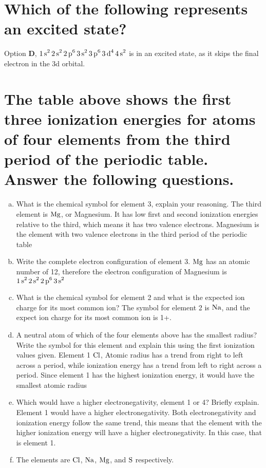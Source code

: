 \documentclass[11pt]{article}
\begin{document}
\section{Which of the following represents an excited state?}
\label{sec:orgaf3fbb6}
Option \textbf{D}, \(\ce{1s^2 2s^2 2p^6 3s^2 3p^6 3d^4 4s^2}\) is in an excited state, as it skips the final electron in the 3d orbital.

\section{The table above shows the first three ionization energies for atoms of four elements from the third period of the periodic table. Answer the following questions.}
\label{sec:org3775e52}
\begin{enumerate}[(a)]
\item What is the chemical symbol for element 3, explain your reasoning.
 The third element is \(\ce{Mg}\), or Magnesium. It has low first and second
ionization energies relative to the third, which means it has two valence
electrons. Magnesium is the element with two valence electrons in the third
period of the periodic table

\item Write the complete electron configuration of element 3.
 \(\ce{Mg}\) has an atomic number of 12, therefore the electron configuration
of Magnesium is \(\ce{1s^2 2s^2 2p^6 3s^2}\)

\item What is the chemical symbol for element 2 and what is the expected ion charge for its most common ion?
 The symbol for element 2 is \(\ce{Na}\), and the expect ion charge for its
most common ion is 1+.

\item A neutral atom of which of the four elements above has the smallest radius? Write the symbol for this element and explain this using the first ionization values given.
Element 1 \(\ce{Cl}\), Atomic radius has a trend from right to left across a period, while ionization energy has a trend from left to right across a period. Since element 1 has the highest ionization energy, it would have the smallest atomic radius

\item Which would have a higher electronegativity, element 1 or 4? Briefly explain.
Element 1 would have a higher electronegativity. Both electronegativity and ionization energy follow the same trend, this means that the element with the higher ionization energy will have a higher electronegativity. In this case, that is element 1.

\item The elements are \(\ce{Cl}\), \(\ce{Na}\), \(\ce{Mg}\), and \(\ce{S}\) respectively.
\end{enumerate}
\end{document}
